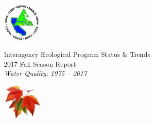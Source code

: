 \documentclass[]{article}\usepackage[]{graphicx}\usepackage[]{color}
\begin{document}
\begin{Row}
  \begin{Cell}{1}
    \begin{center}
      \includegraphics[align=m,height=2cm]{figures/IEP_logo.PNG}
    \end{center}
  \end{Cell}
  \begin{Cell}{6}
    \begin{center}
      \vspace{-0.8cm}		%
      \doublespacing
      {\Large Interagency Ecological Program Status \& Trends } \\
      \vspace{0.2cm}
      {\Huge 2017 Fall Season Report} \\
      {\Large \emph{Water Quality: 1975 -- 2017}}
    \end{center}
  \end{Cell}
  \begin{Cell}{1}
    \begin{center}
      \includegraphics[align=m,height=1.9cm]{figures/fall_logo.PNG}
    \end{center}
  \end{Cell}
  \begin{Cell}{4}
  \end{Cell}
\end{Row}
\end{document}
